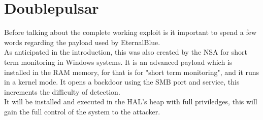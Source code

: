 \section{Doublepulsar}
Before talking about the complete working exploit is it important to spend a few words regarding the payload used by EternalBlue.\\
As anticipated in the introduction, this was also created by the NSA for short term monitoring in Windows systems.
It is an advanced payload which is installed in the RAM memory, for that is for "short term monitoring", and it runs in a kernel mode. It opens a backdoor using the SMB port and service, this increments 
the difficulty of detection.\\
It will be installed and executed in the HAL's heap with full priviledges, this will gain the full control of the system to the attacker.